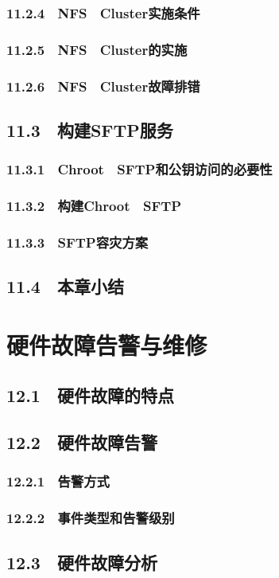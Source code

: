 \documentclass[12pt,UTF8]{ctexbook}
\begin{document}
{\subsection{11.2.4　NFS　Cluster实施条件}
\subsection{11.2.5　NFS　Cluster的实施}
\subsection{11.2.6　NFS　Cluster故障排错}
\section{11.3　构建SFTP服务}
\subsection{11.3.1　Chroot　SFTP和公钥访问的必要性}
\subsection{11.3.2　构建Chroot　SFTP}
\subsection{11.3.3　SFTP容灾方案}
\section{11.4　本章小结}
\chapter{硬件故障告警与维修}
\section{12.1　硬件故障的特点}
\section{12.2　硬件故障告警}
\subsection{12.2.1　告警方式}
\subsection{12.2.2　事件类型和告警级别}
\section{12.3　硬件故障分析}
}
\end{document}
